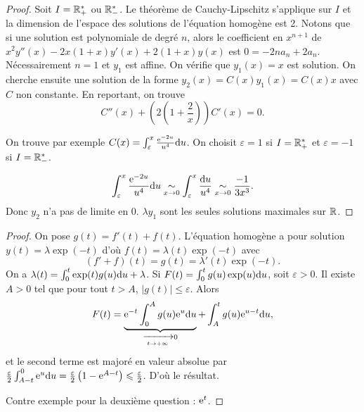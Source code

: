 \documentclass[12pt]{article}
\begin{document}
\begin{proof}
	Soit $I=\mathbb{R}_{+}^{*}$ ou $\mathbb{R}_{-}^{*}$. Le théorème de Cauchy-Lipschitz s'applique sur $I$ et la dimension de l'espace des solutions de l'équation homogène est 2. Notons que si une solution est polynomiale de degré $n$, alors le coefficient en $x^{n+1}$ de $x^{2}y''(x)-2x(1+x)y'(x)+2(1+x)y(x)$ est $0=-2na_n+2a_n$. Nécessairement $n=1$ et $y_1$ est affine. On vérifie que $y_1(x)=x$ est solution. On cherche ensuite une solution de la forme $y_2(x)=C(x)y_1(x)=C(x)x$ avec $C$ non constante. En reportant, on trouve 
	\begin{equation}
		C''(x)+\left(2\left(1+\frac{2}{x}\right)\right)C'(x)=0.
	\end{equation}

	On trouve par exemple $C(x)=\int_{\varepsilon}^{x}\frac{\mathrm{e}^{-2 u}}{u^{4}}\mathrm{d} u$. On choisit $\varepsilon=1$ si $I=\mathbb{R}_{+}^{*}$ et $\varepsilon=-1$ si $I=\mathbb{R}_{-}^{*}$.

	\begin{equation}
		\int_{\varepsilon}^{x}\frac{\mathrm{e}^{-2u}}{u^{4}}\mathrm{d} u\underset{x\to0}{\sim}\int_{\varepsilon}^{x}\frac{\mathrm{d} u}{u^{4}}\underset{x\to0}{\sim}\frac{-1}{3x^{3}}.
	\end{equation}
	Donc $y_2$ n'a pas de limite en 0. $\lambda y_1$ sont les seules solutions maximales sur $\mathbb{R}$.
\end{proof}

\begin{proof}
	On pose $g(t)=f'(t)+f(t)$. L'équation homogène a pour solution $y(t)=\lambda\exp(-t)$ d'où $f(t)=\lambda(t)\exp(-t)$ avec 
	\begin{equation}
		(f'+f)(t)=g(t)=\lambda'(t)\exp(-t).
	\end{equation}
	On a $\lambda(t)=\int_{0}^{t}\exp(t) g(u)\mathrm{d} u+\lambda$. Si $F(t)=\int_{0}^{t}g(u)\exp(u)\mathrm{d} u$, soit $\varepsilon>0$. Il existe $A>0$ tel que pour tout $t>A$, $\left\lvert g(t)\right\rvert\leqslant\varepsilon$. Alors 
	\begin{equation}
		F(t)=\underbrace{\mathrm{e}^{-t}\int_{0}^{A}g(u)\mathrm{e}^{u}\mathrm{d} u}_{\xrightarrow[t\to+\infty]{}0}+\int_{A}^{t}g(u)\mathrm{e}^{u-t}\mathrm{d} u,
	\end{equation}
	et le second terme est majoré en valeur absolue par $\frac{\varepsilon}{2}\int_{A-t}^{0}\mathrm{e}^{u}\mathrm{d} u=\frac{\varepsilon}{2}\left(1-\mathrm{e}^{A-t}\right)\leqslant\frac{\varepsilon}{2}$. D'où le résultat.

	Contre exemple pour la deuxième question : $\mathrm{e}^{t}$.
\end{proof}
\end{document}
